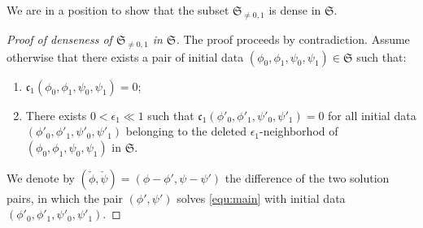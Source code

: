 \documentclass[a4paper,reqno]{amsart}
\theoremstyle{definition}
\numberwithin{equation}{section}
\def\Sfrak{\mathfrak{S}}
\begin{document}
We are in a position to show that the subset $\Sfrak_{\neq 0, 1}$ is dense in $\Sfrak$.

\begin{proof}[Proof of denseness of $\Sfrak_{\neq 0, 1}$ in $\Sfrak$]

The proof proceeds by contradiction.
Assume otherwise that there exists a pair of initial data $(\phi_0, \phi_1, \psi_0, \psi_1)\in \Sfrak$ such that:
\begin{enumerate}[label=\arabic*)]
    \item $\mathfrak{c}_1(\phi_0, \phi_1, \psi_0, \psi_1) = 0$;
    \item\label{point2:contradictionofdense}
    There exists $0<\epsilon_1\ll1$ such that $\mathfrak{c}_1(\phi'_0, \phi'_1, \psi'_0, \psi'_1)=0$ for all initial data $(\phi'_0, \phi'_1, \psi'_0, \psi'_1)$  belonging to the deleted $\epsilon_1$-neighborhod of $(\phi_0, \phi_1, \psi_0, \psi_1)$ in $\Sfrak$.
\end{enumerate}

We denote by $(\check{\phi}, \check{\psi})=(\phi - \phi', \psi-\psi')$ the difference of the two solution pairs, in which the pair $(\phi', \psi')$ solves \eqref{equ:main} with initial data $(\phi'_0, \phi'_1, \psi'_0, \psi'_1)$.


\end{proof}
\end{document}
